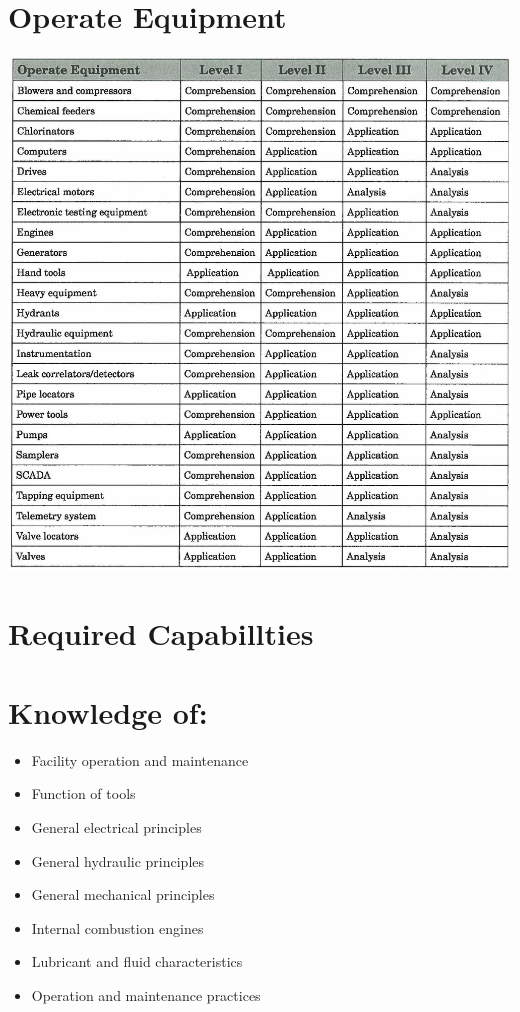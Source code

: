\documentclass[10pt]{article}
\begin{document}
\section{Operate Equipment}
\includegraphics[max width=\textwidth]{2022_11_10_beeca89b60229885003dg-27}

\section{Required Capabillties}
\section{Knowledge of:}
\begin{itemize}
  \item Facility operation and maintenance

  \item Function of tools

  \item General electrical principles

  \item General hydraulic principles

  \item General mechanical principles

  \item Internal combustion engines

  \item Lubricant and fluid characteristics

  \item Operation and maintenance practices

\end{itemize}
\end{document}

